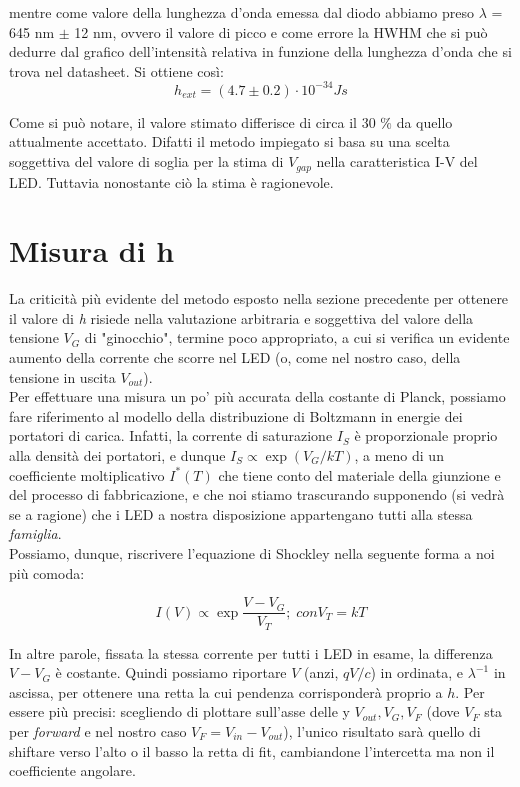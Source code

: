 \documentclass[journal, a4paper]{IEEEtran}
\begin{document}
mentre come valore della lunghezza d'onda emessa dal diodo abbiamo preso $\lambda$ = 645 nm $\pm$ 12 nm, ovvero il valore di picco e come errore la HWHM che si può dedurre dal grafico dell'intensità relativa in funzione della lunghezza d'onda che si trova nel datasheet. Si ottiene così:
\begin{equation}
h_{ext} = (4.7 \pm 0.2) \cdot 10^{-34} Js
\end{equation}

Come si può notare, il valore stimato differisce di circa il 30 $\%$ da quello attualmente accettato. Difatti il metodo impiegato si basa su una scelta soggettiva del valore di soglia per la stima di $V_{gap}$ nella caratteristica I-V del LED. Tuttavia nonostante ciò la stima è ragionevole.

\section{Misura di h}

La criticità più evidente del metodo esposto nella sezione precedente per ottenere il valore di \textit{h} risiede nella valutazione arbitraria e soggettiva del valore della tensione $V_G$ di "ginocchio", termine poco appropriato, a cui si verifica un evidente aumento della corrente che scorre nel LED (o, come nel nostro caso, della tensione in uscita $V_{out}$).\\

Per effettuare una misura un po' più accurata della costante di Planck, possiamo fare riferimento al modello della distribuzione di Boltzmann in energie dei portatori di carica. Infatti, la corrente di saturazione $I_S$ è proporzionale proprio alla densità dei portatori, e dunque $I_S \propto \exp(V_G/kT)$, a meno di un coefficiente moltiplicativo $I^*(T)$ che tiene conto del materiale della giunzione e del processo di fabbricazione, e che noi stiamo trascurando supponendo (si vedrà se a ragione) che i LED a nostra disposizione appartengano tutti alla stessa \textit{famiglia}.\\
Possiamo, dunque, riscrivere l'equazione di Shockley nella seguente forma a noi più comoda:

\begin{equation}\label{new_shockley}
I(V)  \propto \exp{\frac{V-V_G}{V_T}} ; \; \boxed{con V_T = kT}
\end{equation}

In altre parole, fissata la stessa corrente per tutti i LED in esame, la differenza $V-V_G$ è costante. Quindi possiamo riportare $V$ (anzi, $qV/c$) in ordinata, e $\lambda^{-1}$ in ascissa, per ottenere una retta la cui pendenza corrisponderà proprio a $h$. Per essere più precisi: scegliendo di plottare sull'asse delle y $V_{out}, V_G, V_F$ (dove $V_F$ sta per \textit{forward} e nel nostro caso $V_F = V_{in} - V_{out}$), l'unico risultato sarà quello di shiftare verso l'alto o il basso la retta di fit, cambiandone l'intercetta ma non il coefficiente angolare.\\
\end{document}
